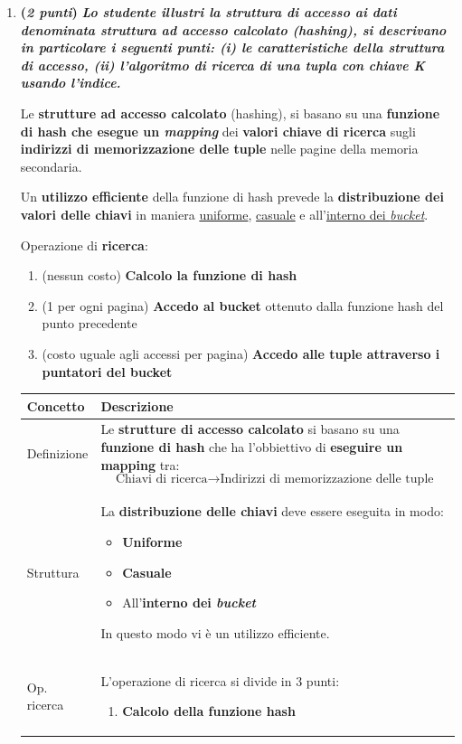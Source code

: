 \documentclass[a4paper]{article}
\begin{document}
\begin{enumerate}
		\item \textbf{(\emph{2 punti})} \textcolor{Green4}{\textbf{\emph{Lo studente illustri la struttura di accesso ai dati denominata struttura ad accesso calcolato (hashing), si descrivano in particolare i seguenti punti: (i) le caratteristiche della struttura di accesso, (ii) l'algoritmo di ricerca di una tupla con chiave K usando l'indice.}}}\label{dom: struttura ad accesso calcolato - hashing}
		
		Le \textbf{strutture ad accesso calcolato} (hashing), si basano su una \textbf{funzione di hash che esegue un \emph{mapping}} dei \textbf{valori chiave di ricerca} sugli \textbf{indirizzi di memorizzazione delle tuple} nelle pagine della memoria secondaria.
		
		Un \textbf{utilizzo efficiente} della funzione di hash prevede la \textbf{distribuzione dei valori delle chiavi} in maniera \underline{uniforme}, \underline{casuale} e all'\underline{interno dei \emph{bucket}}.
		
		Operazione di \textbf{ricerca}:
		\begin{enumerate}
			\item (nessun costo) \textbf{Calcolo la funzione di hash}
			
			\item (1 per ogni pagina) \textbf{Accedo al bucket} ottenuto dalla funzione hash del punto precedente
			
			\item (costo uguale agli accessi per pagina) \textbf{Accedo alle tuple attraverso i puntatori del bucket}
		\end{enumerate}
		
		\begin{table}[!htp]
			\centering
			\begin{tabular}{@{} l p{27em} @{}}
				\toprule
				Concetto & Descrizione \\
				\midrule
				Definizione & Le \textbf{strutture di accesso calcolato} si basano su una \textbf{funzione di hash} che ha l'obbiettivo di \textbf{eseguire un mapping} tra:
				\begin{equation*}
					\text{Chiavi di ricerca} \longrightarrow \text{Indirizzi di memorizzazione delle tuple}
				\end{equation*} \\ 
				Struttura	& La \textbf{distribuzione delle chiavi} deve essere eseguita in modo:
				\begin{itemize}
					\item \textbf{Uniforme}
					\item \textbf{Casuale}
					\item All'\textbf{interno dei \emph{bucket}}
				\end{itemize}
				In questo modo vi è un utilizzo efficiente. \\ [1em]
				Op. ricerca	& L'operazione di ricerca si divide in 3 punti:
				\begin{enumerate}
					\item \textbf{Calcolo della funzione hash}
					

\end{enumerate}
\end{tabular}
\end{table}
\end{enumerate}
\end{document}
